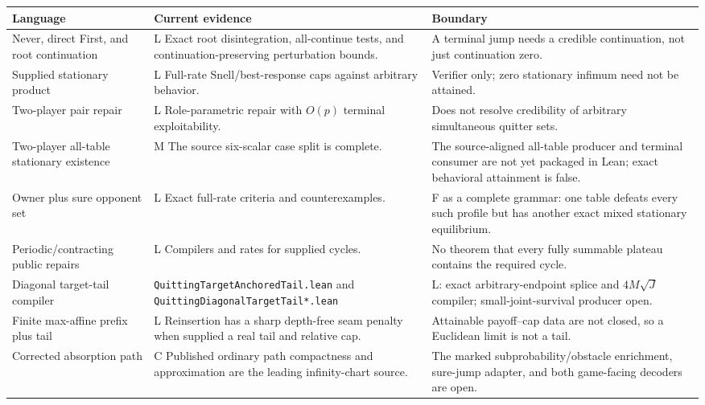 \documentclass[11pt]{article}
\newcommand{\LTag}{\textsf{L}}
\newcommand{\MTag}{\textsf{M}}
\newcommand{\CTag}{\textsf{C}}
\newcommand{\FTag}{\textsf{F}}
\newcommand{\Prod}{\LTag}
\newcommand{\Audit}{\MTag}
\newcommand{\Cond}{\CTag}
\newcommand{\Refuted}{\FTag}
\newcommand{\Status}[1]{#1}
\begin{document}
\begin{longtable}{@{}p{}p{}p{}@{}}
\toprule
Language & Current evidence & Boundary\\
\midrule
\endhead
Never, direct First, and root continuation &
\Status{\Prod} Exact root disintegration, all-continue tests, and
continuation-preserving perturbation bounds. &
A terminal jump needs a credible continuation, not just continuation zero.\\
Supplied stationary product &
\Status{\Prod} Full-rate Snell/best-response caps against arbitrary behavior. &
Verifier only; zero stationary infimum need not be attained.\\
Two-player pair repair &
\Status{\Prod} Role-parametric repair with \(O(p)\) terminal exploitability. &
Does not resolve credibility of arbitrary simultaneous quitter sets.\\
Two-player all-table stationary existence &
\Status{\Audit} The source six-scalar case split is complete. &
The source-aligned all-table producer and terminal consumer are not yet
packaged in Lean; exact behavioral attainment is false.\\
Owner plus sure opponent set &
\Status{\Prod} Exact full-rate criteria and counterexamples. &
\Status{\Refuted} as a complete grammar: one table defeats every such profile
but has another exact mixed stationary equilibrium.\\
Periodic/contracting public repairs &
\Status{\Prod} Compilers and rates for supplied cycles. &
No theorem that every fully summable plateau contains the required cycle.\\
Diagonal target-tail compiler &
\texttt{QuittingTargetAnchoredTail.lean} and
\texttt{QuittingDiagonalTargetTail*.lean} &
\Prod: exact arbitrary-endpoint splice and \(4M\sqrt J\) compiler;
small-joint-survival producer open.\\
Finite max-affine prefix plus tail &
\Status{\Prod} Reinsertion has a sharp depth-free seam penalty when supplied
a real tail and relative cap. &
Attainable payoff--cap data are not closed, so a Euclidean limit is not a
tail.\\
Corrected absorption path &
\Status{\Cond} Published ordinary path compactness and approximation are the
leading infinity-chart source. &
The marked subprobability/obstacle enrichment, sure-jump adapter, and both
game-facing decoders are open.\\
\bottomrule
\end{longtable}
\end{document}

